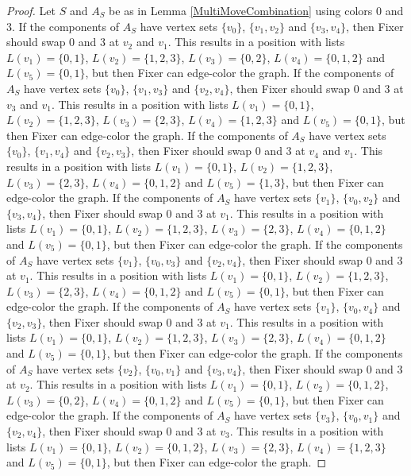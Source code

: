 \documentclass[12pt]{amsart}
\theoremstyle{plain}
\theoremstyle{definition}
\theoremstyle{remark}
\begin{document}
\begin{proof}
Let $S$ and $A_S$ be as in Lemma \ref{MultiMoveCombination} using colors $0$ and $3$. If the components of $A_S$ have vertex sets $\{v_0\}$, $\{v_1, v_2\}$ and $\{v_3, v_4\}$, then Fixer should swap 0 and 3 at $v_2$ and $v_1$. This results in a position with lists $L(v_1) = \{0, 1\}$, $L(v_2) = \{1, 2, 3\}$, $L(v_3) = \{0, 2\}$, $L(v_4) = \{0, 1, 2\}$ and $L(v_5) = \{0, 1\}$, but then Fixer can edge-color the graph.
If the components of $A_S$ have vertex sets $\{v_0\}$, $\{v_1, v_3\}$ and $\{v_2, v_4\}$, then Fixer should swap 0 and 3 at $v_3$ and $v_1$. This results in a position with lists $L(v_1) = \{0, 1\}$, $L(v_2) = \{1, 2, 3\}$, $L(v_3) = \{2, 3\}$, $L(v_4) = \{1, 2, 3\}$ and $L(v_5) = \{0, 1\}$, but then Fixer can edge-color the graph.
If the components of $A_S$ have vertex sets $\{v_0\}$, $\{v_1, v_4\}$ and $\{v_2, v_3\}$, then Fixer should swap 0 and 3 at $v_4$ and $v_1$. This results in a position with lists $L(v_1) = \{0, 1\}$, $L(v_2) = \{1, 2, 3\}$, $L(v_3) = \{2, 3\}$, $L(v_4) = \{0, 1, 2\}$ and $L(v_5) = \{1, 3\}$, but then Fixer can edge-color the graph.
If the components of $A_S$ have vertex sets $\{v_1\}$, $\{v_0, v_2\}$ and $\{v_3, v_4\}$, then Fixer should swap 0 and 3 at $v_1$. This results in a position with lists $L(v_1) = \{0, 1\}$, $L(v_2) = \{1, 2, 3\}$, $L(v_3) = \{2, 3\}$, $L(v_4) = \{0, 1, 2\}$ and $L(v_5) = \{0, 1\}$, but then Fixer can edge-color the graph.
If the components of $A_S$ have vertex sets $\{v_1\}$, $\{v_0, v_3\}$ and $\{v_2, v_4\}$, then Fixer should swap 0 and 3 at $v_1$. This results in a position with lists $L(v_1) = \{0, 1\}$, $L(v_2) = \{1, 2, 3\}$, $L(v_3) = \{2, 3\}$, $L(v_4) = \{0, 1, 2\}$ and $L(v_5) = \{0, 1\}$, but then Fixer can edge-color the graph.
If the components of $A_S$ have vertex sets $\{v_1\}$, $\{v_0, v_4\}$ and $\{v_2, v_3\}$, then Fixer should swap 0 and 3 at $v_1$. This results in a position with lists $L(v_1) = \{0, 1\}$, $L(v_2) = \{1, 2, 3\}$, $L(v_3) = \{2, 3\}$, $L(v_4) = \{0, 1, 2\}$ and $L(v_5) = \{0, 1\}$, but then Fixer can edge-color the graph.
If the components of $A_S$ have vertex sets $\{v_2\}$, $\{v_0, v_1\}$ and $\{v_3, v_4\}$, then Fixer should swap 0 and 3 at $v_2$. This results in a position with lists $L(v_1) = \{0, 1\}$, $L(v_2) = \{0, 1, 2\}$, $L(v_3) = \{0, 2\}$, $L(v_4) = \{0, 1, 2\}$ and $L(v_5) = \{0, 1\}$, but then Fixer can edge-color the graph.
If the components of $A_S$ have vertex sets $\{v_3\}$, $\{v_0, v_1\}$ and $\{v_2, v_4\}$, then Fixer should swap 0 and 3 at $v_3$. This results in a position with lists $L(v_1) = \{0, 1\}$, $L(v_2) = \{0, 1, 2\}$, $L(v_3) = \{2, 3\}$, $L(v_4) = \{1, 2, 3\}$ and $L(v_5) = \{0, 1\}$, but then Fixer can edge-color the graph.

\end{proof}
\end{document}
